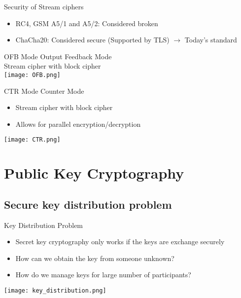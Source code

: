 \begin{remark} Security of Stream ciphers
    \begin{itemize}
        \item RC4, GSM A5/1 and A5/2: Considered broken
        \item ChaCha20: Considered secure (Supported by TLS) $\rightarrow$ Today's standard
    \end{itemize}
\end{remark}


\begin{concept}{OFB Mode} Output Feedback Mode\\
    Stream cipher with block cipher\\
\texttt{[image: OFB.png]}
\end{concept}



\begin{concept}{CTR Mode} Counter Mode
    \begin{itemize}
        \item Stream cipher with block cipher
        \item Allows for parallel encryption/decryption
    \end{itemize}
    \texttt{[image: CTR.png]}
\end{concept}



\multend



\raggedcolumns
\columnbreak



\section{Public Key Cryptography}

\subsection{Secure key distribution problem}

\begin{concept}{Key Distribution Problem}
    \begin{itemize}
        \item Secret key cryptography only works if the keys are exchange securely
        \item How can we obtain the key from someone unknown?
        \item How do we manage keys for large number of participants?
    \end{itemize}
    \texttt{[image: key\_distribution.png]}
\end{concept}

